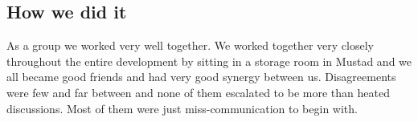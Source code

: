 \subsection{How we did it}
As a group we worked very well together.
We worked together very closely throughout the entire development by sitting in a storage room in Mustad and we all became good friends and had very good synergy between us.
Disagreements were few and far between and none of them escalated to be more than heated discussions. Most of them were just miss-communication to begin with. 

